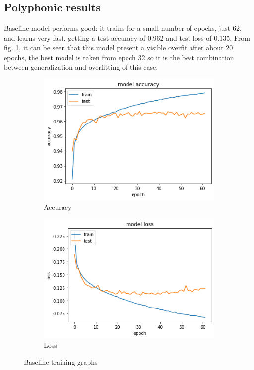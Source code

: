 \documentclass{article}
\begin{document}
\subsection{Polyphonic results}
\label{subsec:poly_results}

Baseline model performs good: it trains for a small number of epochs, just 62, and learns very fast, getting a test accuracy of 0.962 and test loss of 0.135. From fig. \ref{fig:poly_base_result}, it can be seen that this model present a visible overfit after about 20 epochs, the best model is taken from epoch 32 so it is the best combination between generalization and overfitting of this case. 

\begin{figure}[H]
	\centering
	\begin{subfigure}{.5\textwidth}
		\centering
		\includegraphics[width=.9\linewidth]{./images/poly/baseline_acc.png}
		\caption{Accuracy}
	\end{subfigure}%
	\begin{subfigure}{.5\textwidth}
		\centering
		\includegraphics[width=.9\linewidth]{./images/poly/baseline_loss.png}
		\caption{Loss}
	\end{subfigure}
	\caption{Baseline training graphs}
	\label{fig:poly_base_result}
\end{figure}
\end{document}
